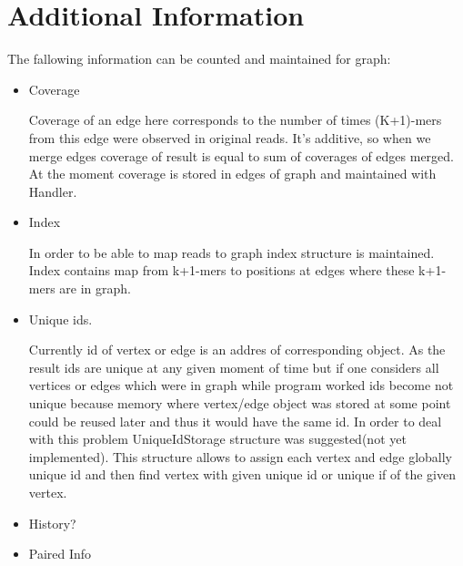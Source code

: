 \documentclass[14pt]{article}
\begin{document}
\section{Additional Information}
The fallowing information can be counted and maintained for graph:

\begin{itemize}
\item Coverage

Coverage of an edge here corresponds to the number of times (K+1)-mers from this edge were observed in original reads. It's additive, so when we merge edges coverage of result is equal to sum of coverages of edges merged. At the moment coverage is stored in edges of graph and maintained with Handler.

\item Index

In order to be able to map reads to graph index structure is maintained. Index contains map from k+1-mers to positions at edges where these k+1-mers are in graph.

\item Unique ids.

Currently id of vertex or edge is an addres of corresponding object. As the result ids are unique at any given moment of time but if one considers all vertices or edges which were in graph while program worked ids become not unique because memory where vertex/edge object was stored at some point could be reused later and thus it would have the same id. In order to deal with this problem UniqueIdStorage structure was suggested(not yet implemented). This structure allows to assign each vertex and edge globally unique id and then find vertex with given unique id or unique if of the given vertex.

\item History?

\item Paired Info

\end{itemize}
\end{document}
